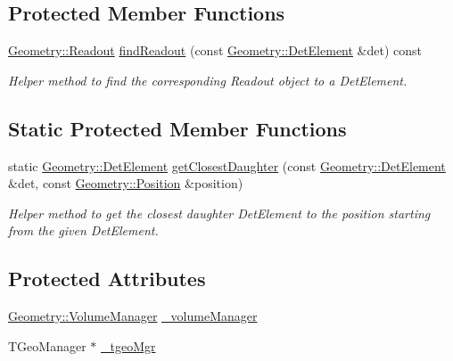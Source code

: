 \subsection*{Protected Member Functions}
\begin{DoxyCompactItemize}
\item 
\hyperlink{class_d_d4hep_1_1_geometry_1_1_readout}{Geometry::Readout} \hyperlink{class_d_d4hep_1_1_d_d_rec_1_1_i_d_decoder_a1327b3c8e2152ab29ef2a26047460c59}{findReadout} (const \hyperlink{class_d_d4hep_1_1_geometry_1_1_det_element}{Geometry::DetElement} \&det) const 
\begin{DoxyCompactList}\small\item\em Helper method to find the corresponding Readout object to a DetElement. \item\end{DoxyCompactList}\end{DoxyCompactItemize}
\subsection*{Static Protected Member Functions}
\begin{DoxyCompactItemize}
\item 
static \hyperlink{class_d_d4hep_1_1_geometry_1_1_det_element}{Geometry::DetElement} \hyperlink{class_d_d4hep_1_1_d_d_rec_1_1_i_d_decoder_a7ff69a5376066763ee49fdf228a362b3}{getClosestDaughter} (const \hyperlink{class_d_d4hep_1_1_geometry_1_1_det_element}{Geometry::DetElement} \&det, const \hyperlink{namespace_d_d4hep_1_1_geometry_a55083902099d03506c6db01b80404900}{Geometry::Position} \&position)
\begin{DoxyCompactList}\small\item\em Helper method to get the closest daughter DetElement to the position starting from the given DetElement. \item\end{DoxyCompactList}\end{DoxyCompactItemize}
\subsection*{Protected Attributes}
\begin{DoxyCompactItemize}
\item 
\hyperlink{class_d_d4hep_1_1_geometry_1_1_volume_manager}{Geometry::VolumeManager} \hyperlink{class_d_d4hep_1_1_d_d_rec_1_1_i_d_decoder_ad5da6c6624c9c8fa3fa9c0590d9bbb70}{\_\-volumeManager}
\item 
TGeoManager $\ast$ \hyperlink{class_d_d4hep_1_1_d_d_rec_1_1_i_d_decoder_ac50ec26200a394bf0d75f44898910815}{\_\-tgeoMgr}
\end{DoxyCompactItemize}
